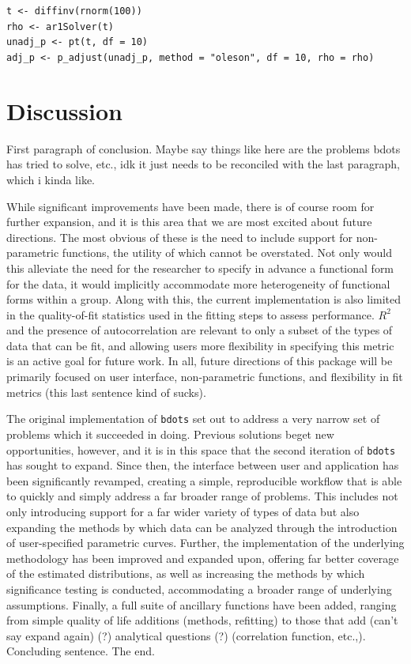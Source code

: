 \documentclass{article}
\newcommand{\xt}{\texttt}%
\begin{document}
\begin{center}
\texttt{t <- diffinv(rnorm(100))} \\
\texttt{rho <- ar1Solver(t)} \\
\texttt{unadj\_p <- pt(t, df = 10)} \\
\texttt{adj\_p <- p\_adjust(unadj\_p, method = "oleson", df = 10, rho = rho)}
\end{center}




\section{Discussion}

First paragraph of conclusion. Maybe say things like here are the problems bdots has tried to solve, etc., idk it just needs to be reconciled with the last paragraph, which i kinda like.

While significant improvements have been made, there is of course room for further expansion, and it is this area that we are most excited about future directions. The most obvious of these is the need to include support for non-parametric functions, the utility of which cannot be overstated. Not only would this alleviate the need for the researcher to specify in advance a functional form for the data, it would implicitly accommodate more heterogeneity of functional forms within a group. Along with this, the current implementation is also limited in the quality-of-fit statistics used in the fitting steps to assess performance. $R^2$ and the presence of autocorrelation are relevant to only a subset of the types of data that can be fit, and allowing users more flexibility in specifying this metric is an active goal for future work. In all, future directions of this package will be primarily focused on user interface, non-parametric functions, and flexibility in fit metrics (this last sentence kind of sucks).

The original implementation of \xt{bdots} set out to address a very narrow set of problems which it succeeded in doing. Previous solutions beget new opportunities, however, and it is in this space that the second iteration of \xt{bdots} has sought to expand. Since then, the interface between user and application has been significantly revamped, creating a simple, reproducible workflow that is able to quickly and simply address a far broader range of problems. This includes not only introducing support for a far wider variety of types of data but also expanding the methods by which data can be analyzed through the introduction of user-specified parametric curves. Further, the implementation of the underlying methodology has been improved and expanded upon, offering far better coverage of the estimated distributions, as well as increasing the methods by which significance testing is conducted, accommodating a broader range of underlying assumptions. Finally, a full suite of ancillary functions have been added, ranging from simple quality of life additions (methods, refitting) to those that add (can't say expand again) (?) analytical questions (?) (correlation function, etc.,). Concluding sentence. The end.
\end{document}
